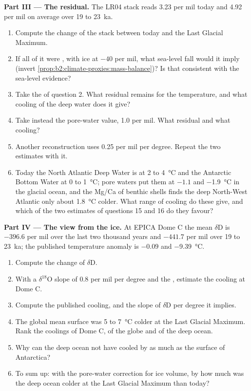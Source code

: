 \begin{problem}
\medskip\noindent\textbf{Part III --- The residual.}
The LR04 stack reads \num{3.23} per mil today and \num{4.92} per mil on average over 19 to
\qty{23}{ka}.
\begin{enumerate}[resume]
  \item Compute the change of the stack between today and the Last Glacial Maximum.
  \item If all of it were , with ice at $-40$ per mil, what sea-level fall would it
        imply (invert \cref{prop:b2:climate-proxies:mass-balance})? Is that consistent with the
        sea-level evidence?
  \item Take the  of question 2. What residual remains for the temperature, and
        what cooling of the deep water does it give?
  \item Take instead the pore-water value, \num{1.0} per mil. What residual and what cooling?
  \item Another reconstruction uses \num{0.25} per mil per degree. Repeat the two estimates with it.
  \item Today the North Atlantic Deep Water is at 2 to \qty{4}{\celsius} and the Antarctic Bottom
        Water at 0 to \qty{1}{\celsius}; pore waters put them at $-1.1$ and \qty{-1.9}{\celsius}
        in the glacial ocean, and the Mg/Ca of benthic shells finds the deep North-West Atlantic
        only about \qty{1.8}{\celsius} colder. What range of cooling do these give, and which of the
        two estimates of questions 15 and 16 do they favour?
\end{enumerate}

\medskip\noindent\textbf{Part IV --- The view from the ice.}
At EPICA Dome C the mean $\delta$D is $-396.6$ per mil over the last two thousand years and
$-441.7$ per mil over 19 to \qty{23}{ka}; the published temperature anomaly is $-0.09$ and
\qty{-9.39}{\celsius}.
\begin{enumerate}[resume]
  \item Compute the change of $\delta$D.
  \item With a $\delta^{18}$O slope of \num{0.8} per mil per degree and the ,
        estimate the cooling at Dome C.
  \item Compute the published cooling, and the slope of $\delta$D per degree it implies.
  \item The global mean surface was 5 to \qty{7}{\celsius} colder at the Last Glacial Maximum.
        Rank the coolings of Dome C, of the globe and of the deep ocean.
  \item Why can the deep ocean not have cooled by as much as the surface of Antarctica?
  \item To sum up: with the pore-water correction for ice volume, by how much was the deep ocean
        colder at the Last Glacial Maximum than today?
\end{enumerate}
\end{problem}
